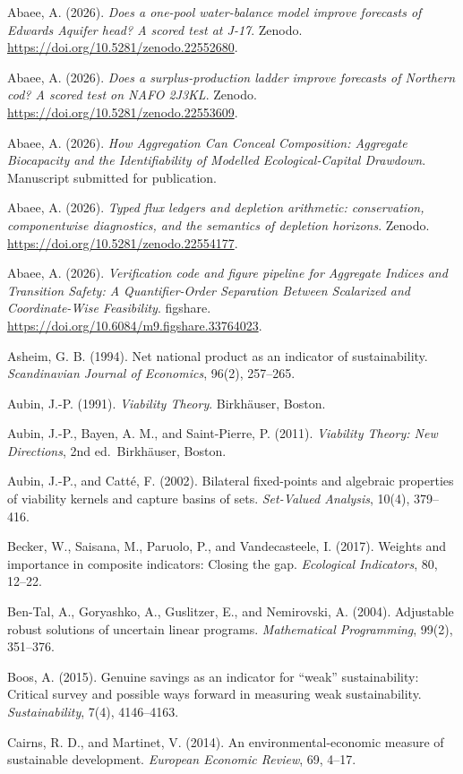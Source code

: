 \documentclass[3p,11pt]{elsarticle}
\begin{document}
Abaee, A. (2026). \emph{Does a one-pool water-balance model improve forecasts of Edwards Aquifer head? A scored test at J-17}. Zenodo. \url{https://doi.org/10.5281/zenodo.22552680}.

Abaee, A. (2026). \emph{Does a surplus-production ladder improve forecasts of Northern cod? A scored test on NAFO 2J3KL}. Zenodo. \url{https://doi.org/10.5281/zenodo.22553609}.

Abaee, A. (2026). \emph{How Aggregation Can Conceal Composition: Aggregate Biocapacity and the Identifiability of Modelled Ecological-Capital Drawdown}. Manuscript submitted for publication.

Abaee, A. (2026). \emph{Typed flux ledgers and depletion arithmetic: conservation, componentwise diagnostics, and the semantics of depletion horizons}. Zenodo. \url{https://doi.org/10.5281/zenodo.22554177}.

Abaee, A. (2026). \emph{Verification code and figure pipeline for Aggregate Indices and Transition Safety: A Quantifier-Order Separation Between Scalarized and Coordinate-Wise Feasibility}. figshare. \url{https://doi.org/10.6084/m9.figshare.33764023}.

Asheim, G. B. (1994). Net national product as an indicator of sustainability. \emph{Scandinavian Journal of Economics}, 96(2), 257--265.

Aubin, J.-P. (1991). \emph{Viability Theory}. Birkh\"auser, Boston.

Aubin, J.-P., Bayen, A. M., and Saint-Pierre, P. (2011). \emph{Viability Theory: New Directions}, 2nd ed.~Birkh\"auser, Boston.

Aubin, J.-P., and Catt\'e, F. (2002). Bilateral fixed-points and algebraic properties of viability kernels and capture basins of sets. \emph{Set-Valued Analysis}, 10(4), 379--416.

Becker, W., Saisana, M., Paruolo, P., and Vandecasteele, I. (2017). Weights and importance in composite indicators: Closing the gap. \emph{Ecological Indicators}, 80, 12--22.

Ben-Tal, A., Goryashko, A., Guslitzer, E., and Nemirovski, A. (2004).
Adjustable robust solutions of uncertain linear programs.
\emph{Mathematical Programming}, 99(2), 351--376.

Boos, A. (2015). Genuine savings as an indicator for ``weak''
sustainability: Critical survey and possible ways forward in measuring
weak sustainability. \emph{Sustainability}, 7(4), 4146--4163.

Cairns, R. D., and Martinet, V. (2014). An environmental-economic
measure of sustainable development. \emph{European Economic Review}, 69,
4--17.
\end{document}
